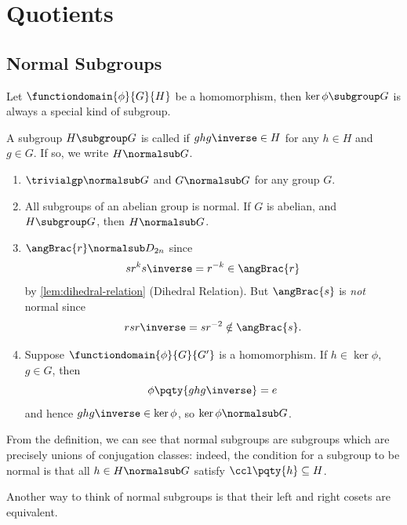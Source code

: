 \section{Quotients}
\label{sec:quotients}

\subsection{Normal Subgroups}
\label{sec:normal-subgroups}

Let \(\functiondomain{\phi}{G}{H}\) be a homomorphism, then \(\ker \phi \subgroup G\) is always a special kind of subgroup.

\begin{definition}
    \label{def:normal-subgroup}%
    A subgroup \(H \subgroup G\) is called  if \(g h g\inverse \in H\) for any \(h \in H\) and \(g \in G\). If so, we write \(H \normalsub G\).
\end{definition}

\begin{examples*}
    \begin{enumerate}
        \item \(\trivialgp \normalsub G\) and \(G \normalsub G\) for any group \(G\).
        \item All subgroups of an abelian group is normal. If \(G\) is abelian, and \(H \subgroup G\), then \(H \normalsub G\).
        \item \(\angBrac{r} \normalsub D_{2n}\) since
        \[
            s r^k s\inverse = r^{-k} \in \angBrac{r}
        \]
        by \autoref{lem:dihedral-relation} (Dihedral Relation). But \(\angBrac{s}\) is \emph{not} normal since
        \[
            r s r \inverse = s r^{-2} \notin \angBrac{s}.
        \]
        \item Suppose \(\functiondomain{\phi}{G}{G'}\) is a homomorphism. If \(h \in \ker \phi\), \(g \in G\), then
        \[
            \phi\pqty{g h g\inverse} = e
        \]
        and hence \(g h g\inverse \in \ker \phi\), so \(\ker \phi \normalsub G\).
    \end{enumerate}
\end{examples*}

From the definition, we can see that normal subgroups are subgroups which are precisely unions of conjugation classes: indeed, the condition for a subgroup to be normal is that all \(h \in H \normalsub G\) satisfy \(\ccl\pqty{h} \subseteq H\).

Another way to think of normal subgroups is that their left and right cosets are equivalent.


